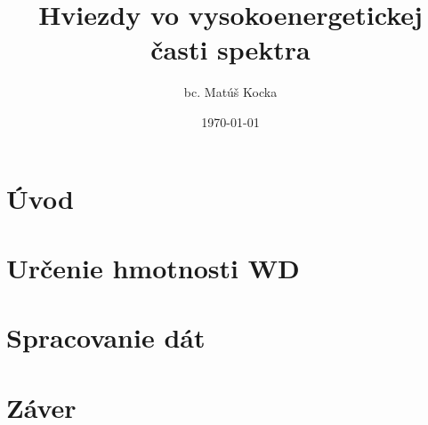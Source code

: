 \documentclass{beamer}
\begin{document}
\title{Hviezdy vo vysokoenergetickej časti spektra }  
\author{bc. Matúš Kocka}
\date{\today} 
\frame{\titlepage} 


\section{Úvod} 

\section{Určenie hmotnosti WD} 

\section{Spracovanie dát} 

\section{Záver} 
\end{document}
